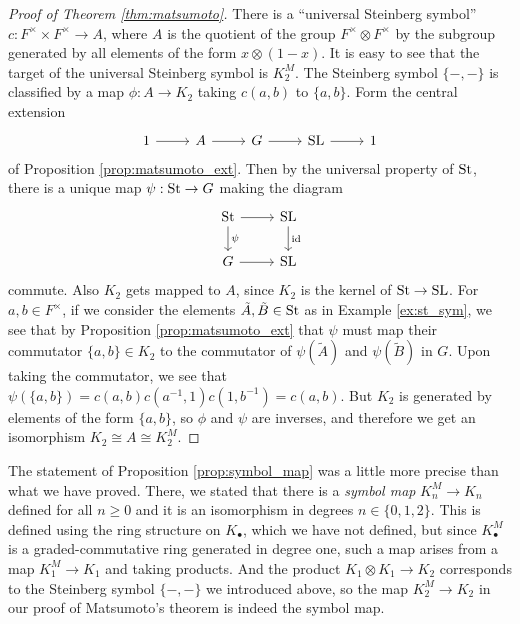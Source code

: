 \begin{proof}[Proof of Theorem \ref{thm:matsumoto}]
    There is a ``universal Steinberg symbol'' $c : F^\times \times F^\times \to A$, where $A$ is the quotient of the group $F^\times \otimes F^\times$ by the subgroup generated by all elements of the form $x \otimes (1 - x)$. It is easy to see that the target of the universal Steinberg symbol is $K_2^M$. The Steinberg symbol $\{ -, - \}$ is classified by a map $\phi : A \to K_2$ taking $c(a, b)$ to $\{ a, b \}$. Form the central extension
    \[
        \begin{tikzcd}
            \arrow[from=1-1, to=1-2]
            \arrow[from=1-2, to=1-3]
            \arrow[from=1-3, to=1-4]
            \arrow[from=1-4, to=1-5]
            1 & A & G & \SL & 1
        \end{tikzcd}
    \]
    of Proposition \ref{prop:matsumoto_ext}. Then by the universal property of $\mathrm{St}$, there is a unique map $\psi : \mathrm{St} \to G$ making the diagram
    \[
        \begin{tikzcd}
            \arrow[from=1-1, to=1-2]
            \arrow["{\psi}", from=1-1, to=2-1]
            \arrow["{\mathrm{id}}", from=1-2, to=2-2]
            \arrow[from=2-1, to=2-2]
            \St & \SL \\
            G & \SL
        \end{tikzcd}
    \]
    commute. Also $K_2$ gets mapped to $A$, since $K_2$ is the kernel of $\mathrm{St} \to \mathrm{SL}$. For $a, b \in F^\times$, if we consider the elements $\tilde{A}, \tilde{B} \in \mathrm{St}$ as in Example \ref{ex:st_sym}, we see that by Proposition \ref{prop:matsumoto_ext} that $\psi$ must map their commutator $\{ a, b \} \in K_2$ to the commutator of $\psi(\tilde{A})$ and $\psi(\tilde{B})$ in $G$. Upon taking the commutator, we see that $\psi(\{ a, b \}) = c(a, b)c(a^{-1}, 1)c(1, b^{-1}) = c(a,b)$. But $K_2$ is generated by elements of the form $\{ a, b \}$, so $\phi$ and $\psi$ are inverses, and therefore we get an isomorphism $K_2 \cong A \cong K_2^M$.
\end{proof}

The statement of Proposition \ref{prop:symbol_map} was a little more precise than what we have proved. There, we stated that there is a \emph{symbol map} $K_n^M \to K_n$ defined for all $n \geq 0$ and it is an isomorphism in degrees $n \in \{ 0, 1, 2 \}$. This is defined using the ring structure on $K_\bullet$, which we have not defined, but since $K_\bullet^M$ is a graded-commutative ring generated in degree one, such a map arises from a map $K_1^M \to K_1$ and taking products. And the product $K_1 \otimes K_1 \to K_2$ corresponds to the Steinberg symbol $\{ -, - \}$ we introduced above, so the map $K_2^M \to K_2$ in our proof of Matsumoto's theorem is indeed the symbol map.

